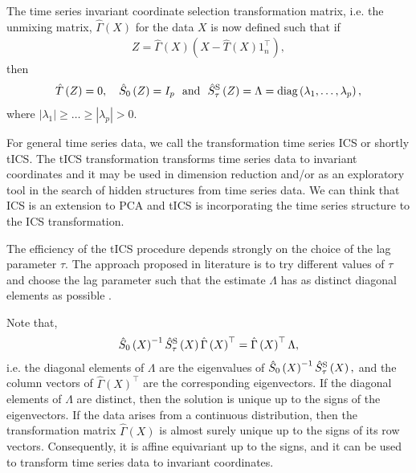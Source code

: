 \documentclass{llncs}
\begin{document}
 The time series invariant coordinate selection transformation matrix, i.e. the unmixing matrix, $\hat{\Gamma}\left(X\right)$ for the data $X$ is now defined such that if 
\begin{align*}
Z= \hat{\Gamma}\left(X\right)\left(X-\hat{T}\left(X\right)1_n^\top\right),
\end{align*}
then
\begin{eqnarray*}
\hat{T}\left(Z\right)=0,\text{ }  \text{ }  \  \hat{S}_0\left(Z\right)=I_p  \text{ } \text{ and } \text{ }  \hat{S}^\textnormal{S}_{\tau}\left(Z\right)=\Lambda=\text{diag}\left(\lambda_1, \ldots, \lambda_p\right),
\end{eqnarray*}
where  $\left|\lambda_1\right|\geq \ldots \geq \left|\lambda_p\right| > 0$.



For general time series data, we call the transformation time series ICS or shortly tICS. The tICS transformation transforms time series data to invariant coordinates and it may be used in dimension reduction and/or as an exploratory tool in the search of hidden structures from time series data. We can think that ICS is an extension to PCA and tICS is incorporating the time series structure to the ICS transformation.

The efficiency of the tICS procedure depends strongly on the choice of the lag parameter $\tau$. The approach proposed in literature is to try different values of $\tau$ and  choose the lag parameter such that the estimate $\Lambda$ has as distinct diagonal elements as possible  \cite{amari2002}.


Note that,
\begin{align*}
\hat{S}_0\left(X\right)^{-1}\hat{S}_{\tau}^\textnormal{S}\left(X\right) \hat{\Gamma}\left(X\right)^\top =\hat{\Gamma}\left(X\right)^\top\Lambda,
\end{align*}
i.e. the diagonal elements of $\Lambda$ are the eigenvalues of $\hat{S}_0\left(X\right)^{-1}\hat{S}^\textnormal{S}_{\tau}\left(X\right),$ and the column vectors of $\hat{\Gamma}\left(X\right)^\top$ are the corresponding eigenvectors. If the diagonal elements of $\Lambda$ are distinct, then the solution is unique up to the signs of the eigenvectors.
If the data arises from a continuous distribution, then the transformation matrix $\hat{\Gamma}\left(X\right)$ is almost surely unique up to the signs of its row vectors. Consequently, it is affine equivariant up to the signs, and it can be used to transform time series data to invariant coordinates.
\end{document}

